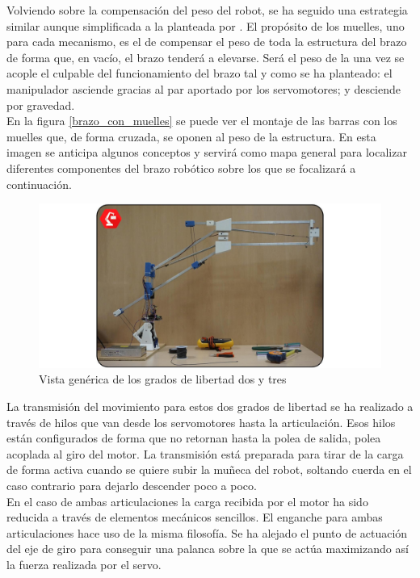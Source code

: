     Volviendo sobre la compensación del peso del robot, se ha seguido una estrategia similar aunque simplificada a la planteada por \cite{Rahman_asimple}. El propósito de los muelles, uno para cada mecanismo, es el de compensar el peso de toda la estructura del brazo de forma que, en vacío, el brazo tenderá a elevarse. Será el peso de la  una vez se acople el culpable del funcionamiento del brazo tal y como se ha planteado: el manipulador asciende gracias al par aportado por los servomotores; y desciende por gravedad.
    \\

    En la figura \ref{brazo_con_muelles} se puede ver el montaje de las barras con los muelles que, de forma cruzada, se oponen al peso de la estructura. En esta imagen se anticipa algunos conceptos y servirá como mapa general para localizar diferentes componentes del brazo robótico sobre los que se focalizará a continuación.

    \begin{figure}[H]
        \centering
        \includegraphics[width=\textwidth]{figuras/Imagenes_Mecanica/foto_brazo_10.jpg}
        \caption{Vista genérica de los grados de libertad dos y tres}
        \label{fig:Mecanica:brazo_con_muelles}
    \end{figure}


    La transmisión del movimiento para estos dos grados de libertad se ha realizado a través de hilos que van desde los servomotores hasta la articulación. Esos hilos están configurados de forma que no retornan hasta la polea de salida, polea acoplada al giro del motor. La transmisión está preparada para tirar de la carga de forma activa cuando se quiere subir la muñeca del robot, soltando cuerda en el caso contrario para dejarlo descender poco a poco.
	\\ 
	
    En el caso de ambas articulaciones la carga recibida por el motor ha sido reducida a través de elementos mecánicos sencillos. El enganche para ambas articulaciones hace uso de la misma filosofía. Se ha alejado el punto de actuación del eje de giro para conseguir una palanca sobre la que se actúa maximizando así la fuerza realizada por el servo.
    \\

